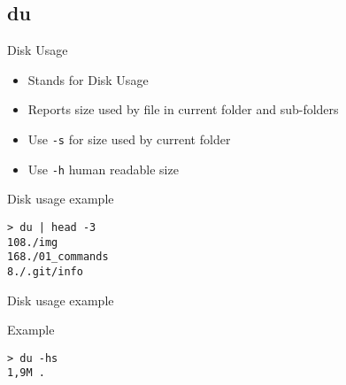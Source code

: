 \subsection{du}

\begin{frame}[fragile]{Disk Usage}
  \begin{itemize}
    \pause \item Stands for Disk Usage
    \pause \item Reports size used by file in current folder and sub-folders
    \pause \item Use \texttt{-s} for size used by current folder
    \pause \item Use \texttt{-h} human readable size
  \end{itemize}
  \pause

  \begin{exampleblock}{Disk usage example}
    \begin{lstlisting}[showstringspaces=false]
> du | head -3
108./img
168./01_commands
8./.git/info
    \end{lstlisting}
  \end{exampleblock}
\end{frame}

\begin{frame}[fragile]{Disk usage example}
  \begin{exampleblock}{Example}
    \begin{lstlisting}[showstringspaces=false]
> du -hs
1,9M .
    \end{lstlisting}
  \end{exampleblock}
\end{frame}
